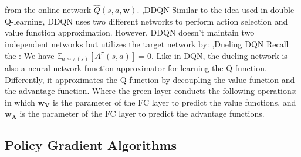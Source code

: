\documentclass[12pt]{report}
\begin{document}
from the online network $\hat{Q}(s,a,\mathbf{w})$.
\sep{DDQN}
Similar to the idea used in double Q-learning, DDQN uses two different networks to perform action selection and value function approximation.
However, DDQN doesn't maintain two independent networks but utilizes the target network by:
\sep{Dueling DQN}
Recall the :
We have $\mathbb{E}_{a\sim\pi(s)}[A^{\pi}(s,a)]=0.$ Like in DQN, the dueling network is also a neural network function approximator for
learning the Q-function. Differently, it approximates the Q function by decoupling the value function and the advantage function.
Where the green layer conducts the following operations:
in which $\mathbf{w_V}$ is the parameter of the FC layer to predict the value functions, and $\mathbf{w_A}$ is the parameter of the FC layer to predict the advantage functions.

\subsection{Policy Gradient Algorithms}
\end{document}
